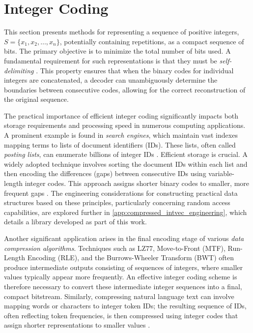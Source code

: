 \section{Integer Coding} \label{sec:integer_coding}

\noindent This section presents methods for representing a sequence of positive integers, $S = \{x_1, x_2, \ldots, x_n\}$, potentially containing repetitions, as a compact sequence of bits. The primary objective is to minimize the total number of bits used. A fundamental requirement for such representations is that they must be \emph{self-delimiting} \cite{witten1999managing}. This property ensures that when the binary codes for individual integers are concatenated, a decoder can unambiguously determine the boundaries between consecutive codes, allowing for the correct reconstruction of the original sequence.

\noindent The practical importance of efficient integer coding significantly impacts both storage requirements and processing speed in numerous computing applications. A prominent example is found in \emph{search engines}, which maintain vast indexes mapping terms to lists of document identifiers (IDs). These lists, often called \emph{posting lists}, can enumerate billions of integer IDs \cite{schutze2008introduction}. Efficient storage is crucial. A widely adopted technique involves sorting the document IDs within each list and then encoding the differences (gaps) between consecutive IDs using variable-length integer codes. This approach assigns shorter binary codes to smaller, more frequent gaps \cite{witten1999managing}. The engineering considerations for constructing practical data structures based on these principles, particularly concerning random access capabilities, are explored further in \autoref{app:compressed_intvec_engineering}, which details a library developed as part of this work.

\noindent Another significant application arises in the final encoding stage of various \emph{data compression algorithms}. Techniques such as LZ77, Move-to-Front (MTF), Run-Length Encoding (RLE), and the Burrows-Wheeler Transform (BWT) often produce intermediate outputs consisting of sequences of integers, where smaller values typically appear more frequently. An effective integer coding scheme is therefore necessary to convert these intermediate integer sequences into a final, compact bitstream. Similarly, compressing natural language text can involve mapping words or characters to integer token IDs; the resulting sequence of IDs, often reflecting token frequencies, is then compressed using integer codes that assign shorter representations to smaller values \cite{witten1999managing}.

